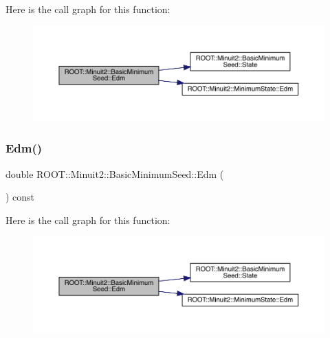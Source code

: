 Here is the call graph for this function\+:
\nopagebreak
\begin{figure}[H]
\begin{center}
\leavevmode
\includegraphics[width=350pt]{de/d50/classROOT_1_1Minuit2_1_1BasicMinimumSeed_a10659878d070bed73df23682eab3e88e_cgraph}
\end{center}
\end{figure}
\mbox{\label{classROOT_1_1Minuit2_1_1BasicMinimumSeed_a10659878d070bed73df23682eab3e88e}} 
\subsubsection{\texorpdfstring{Edm()}{Edm()}\hspace{0.1cm}{\footnotesize\ttfamily [2/2]}}
{\footnotesize\ttfamily double R\+O\+O\+T\+::\+Minuit2\+::\+Basic\+Minimum\+Seed\+::\+Edm (\begin{DoxyParamCaption}{ }\end{DoxyParamCaption}) const\hspace{0.3cm}{\ttfamily [inline]}}

Here is the call graph for this function\+:
\nopagebreak
\begin{figure}[H]
\begin{center}
\leavevmode
\includegraphics[width=350pt]{de/d50/classROOT_1_1Minuit2_1_1BasicMinimumSeed_a10659878d070bed73df23682eab3e88e_cgraph}
\end{center}
\end{figure}
\mbox{\label{classROOT_1_1Minuit2_1_1BasicMinimumSeed_a108de61cfe9f1766c3d7e251202a29df}} 
